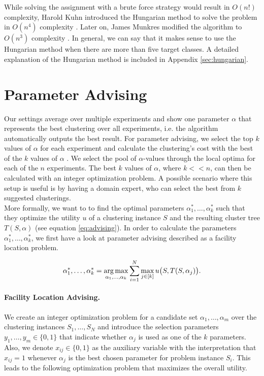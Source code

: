 While solving the assignment with a brute force strategy would result in $O(n!)$ complexity, Harold Kuhn introduced the Hungarian method to solve the problem in $O(n^4)$ complexity \cite{kuhn1955hungarian}. Later on, James Munkres modified the algorithm to $O(n^3)$ complexity \cite{munkres1957algorithms}. In general, we can say that it  makes sense to use the Hungarian method when there are more than five target classes. A detailed explanation of the Hungarian method is included in Appendix \ref{sec:hungarian}.

\section{Parameter Advising}

Our settings average over multiple experiments and show one parameter $\alpha$ that represents the best clustering over all experiments, i.e. the algorithm automatically outputs the best result. For parameter advising, we select the top $k$ values of $\alpha$ for each experiment and calculate the clustering's cost with the best of the $k$ values of $\alpha$ \cite{deblasio2015parameter}. We select the pool of $\alpha$-values through the local optima for each of the $n$ experiments. The best $k$ values of $\alpha$, where $k << n$, can then be calculated with an integer optimization problem. A possible scenario where this setup is useful is by having a domain expert, who can select the best from $k$ suggested clusterings.\\

More formally, we want to to find the optimal parameters $\alpha_1^*, \dots, \alpha_k^*$ such that they optimize the utility $u$ of a clustering instance $S$ and the resulting cluster tree $T(S, \alpha)$ (see equation \ref{eq:advising}). In order to calculate the parameters $\alpha_1^*, \dots, \alpha_k^*$, we first have a look at parameter advising described as a facility location problem.

\begin{equation}
  \alpha_1^*, \dots, \alpha_k^*
  = \operatorname*{arg\,max}_{\alpha_1, \dots, \alpha_k} \sum_{i=1}^N \max_{j \in [k]} u\bigl(S, T(S, \alpha_j)\bigr).
  \label{eq:advising}
\end{equation}

\paragraph{Facility Location Advising.} We create an integer optimization problem for a candidate set $\alpha_1, \dots, \alpha_m$ over the clustering instances $S_1, \dots, S_N$ and introduce the selection parameters $y_1, \dots, y_m \in \{0, 1\}$ that indicate whether $\alpha_j$ is used as one of the $k$ parameters. Also, we denote $x_{ij} \in \{0, 1\}$ as the auxiliary variable with the interpretation that $x_{ij} = 1$ whenever $\alpha_j$ is the best chosen parameter for problem instance $S_i$. This leads to the following optimization problem that maximizes the overall utility.

